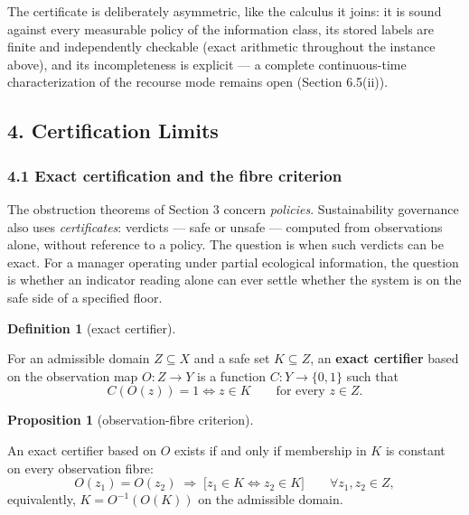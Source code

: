 \documentclass[10pt,twocolumn]{article}
\theoremstyle{definition}
\newtheorem{proposition}{Proposition}
\newtheorem{definition}{Definition}
\begin{document}
The certificate is deliberately asymmetric, like the calculus it joins: it is
sound against every measurable policy of the information class, its stored
labels are finite and independently checkable (exact arithmetic throughout the
instance above), and its incompleteness is explicit --- a complete
continuous-time characterization of the recourse mode remains open
(Section 6.5(ii)).

\subsection{4. Certification Limits}\label{certification-limits}

\subsubsection{4.1 Exact certification and the fibre
criterion}\label{exact-certification-and-the-fibre-criterion}

The obstruction theorems of Section 3 concern \emph{policies}.
Sustainability governance also uses \emph{certificates}: verdicts
--- safe or unsafe --- computed from observations alone, without
reference to a policy. The question is when such verdicts can be exact.
For a manager operating under partial ecological information, the question is whether an indicator reading alone can ever settle whether the system is on the safe side of a specified floor.

\begin{definition}[exact certifier]\label{def:certifier}

For an admissible domain
\(Z \subseteq X\) and a safe set \(K \subseteq Z\), an \textbf{exact
certifier} based on the observation map \(O : Z \to Y\) is a function
\(C : Y \to \{0,1\}\) such that
\[C(O(z)) = 1 \iff z \in K \qquad \text{for every } z \in Z.\]

\end{definition}

\begin{proposition}[observation-fibre criterion]\label{prop:fibre}

An exact certifier
based on \(O\) exists if and only if membership in \(K\) is constant on
every observation fibre:
\[O(z_1) = O(z_2) \;\Longrightarrow\; \big[ z_1 \in K \iff z_2 \in K \big] \qquad \forall z_1, z_2 \in Z, \tag{5}\]
equivalently, \(K = O^{-1}(O(K))\) on the admissible domain.

\end{proposition}
\end{document}
